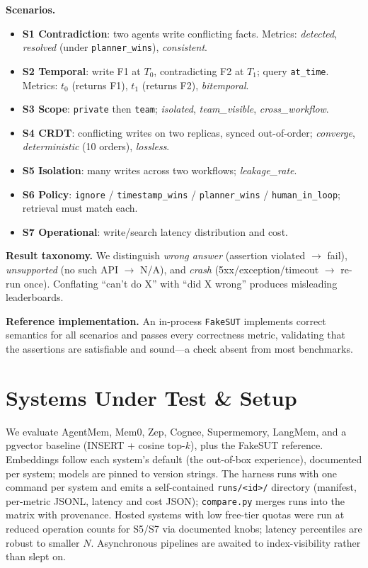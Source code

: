 \documentclass[11pt]{article}
\begin{document}
\textbf{Scenarios.}
\begin{itemize}
  \item \textbf{S1 Contradiction}: two agents write conflicting facts. Metrics:
  \emph{detected}, \emph{resolved} (under \texttt{planner\_wins}), \emph{consistent}.
  \item \textbf{S2 Temporal}: write F1 at $T_0$, contradicting F2 at $T_1$; query
  \texttt{at\_time}. Metrics: $t_0$ (returns F1), $t_1$ (returns F2), \emph{bitemporal}.
  \item \textbf{S3 Scope}: \texttt{private} then \texttt{team}; \emph{isolated},
  \emph{team\_visible}, \emph{cross\_workflow}.
  \item \textbf{S4 CRDT}: conflicting writes on two replicas, synced out-of-order;
  \emph{converge}, \emph{deterministic} (10 orders), \emph{lossless}.
  \item \textbf{S5 Isolation}: many writes across two workflows; \emph{leakage\_rate}.
  \item \textbf{S6 Policy}: \texttt{ignore} / \texttt{timestamp\_wins} /
  \texttt{planner\_wins} / \texttt{human\_in\_loop}; retrieval must match each.
  \item \textbf{S7 Operational}: write/search latency distribution and cost.
\end{itemize}

\textbf{Result taxonomy.}\label{sec:taxonomy} We distinguish \emph{wrong answer}
(assertion violated $\to$ fail), \emph{unsupported} (no such API $\to$ N/A), and
\emph{crash} (5xx/exception/timeout $\to$ re-run once). Conflating ``can't do X''
with ``did X wrong'' produces misleading leaderboards.

\textbf{Reference implementation.} An in-process \texttt{FakeSUT} implements correct
semantics for all scenarios and passes every correctness metric, validating that the
assertions are satisfiable and sound---a check absent from most benchmarks.

\section{Systems Under Test \& Setup}\label{sec:sut}
We evaluate AgentMem, Mem0, Zep, Cognee, Supermemory, LangMem, and a pgvector
baseline (INSERT + cosine top-$k$), plus the FakeSUT reference. Embeddings follow each
system's default (the out-of-box experience), documented per system; models are
pinned to version strings. The harness runs with one command per system and emits a
self-contained \texttt{runs/<id>/} directory (manifest, per-metric JSONL, latency and
cost JSON); \texttt{compare.py} merges runs into the matrix with provenance. Hosted
systems with low free-tier quotas were run at reduced operation counts for S5/S7 via
documented knobs; latency percentiles are robust to smaller $N$. Asynchronous
pipelines are awaited to index-visibility rather than slept on.
\end{document}
